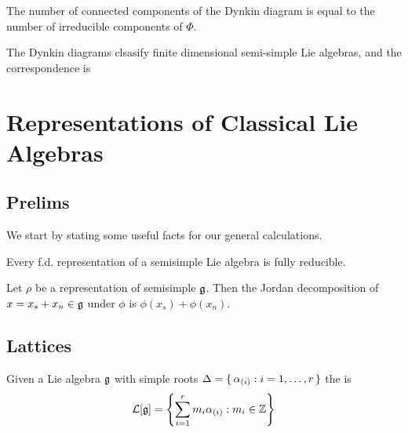 \documentclass{article}
\begin{document}
\begin{prop}
	The number of connected components of the Dynkin diagram is equal to the number of irreducible components of $\Phi$. 
\end{prop}

\begin{theorem}
	The Dynkin diagrams clsasify finite dimensional semi-simple Lie algebras, and the correspondence is 
\end{theorem}

\section{Representations of Classical Lie Algebras}
\subsection{Prelims}
We start by stating some useful facts for our general calculations. 

\begin{theorem}[Weyl]
	Every f.d. representation of a semisimple Lie algebra is fully reducible. 
\end{theorem}

\begin{prop}
	Let $\rho$ be a representation of semisimple $\mathfrak{g}$. Then the Jordan decomposition of $x = x_s + x_n \in \mathfrak{g}$ under $\phi$ is $\phi(x_s)+\phi(x_n)$. 
\end{prop}
\subsection{Lattices}

\begin{definition}
	Given a Lie algebra $\mathfrak{g}$ with simple roots $\Delta=\set{  \alpha_{(i)} : i=1,\dots,r  }$ the  is 
	\[
	\mathcal{L} [\mathfrak{g}] = \left\{ \sum_{i=1}^r m_i \alpha_{(i)} : m_i \in\mathbb{Z} \right\}
	\]
\end{definition}
\end{document}
